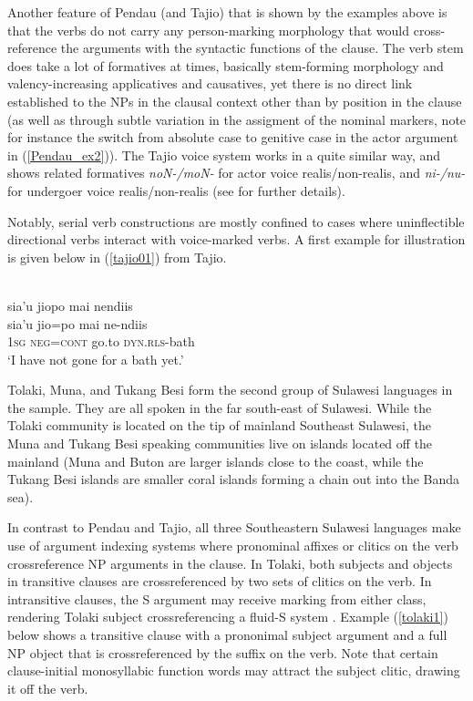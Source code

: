 Another feature of Pendau (and Tajio) that is shown by the examples above is that the verbs do not carry any person-marking morphology that would cross-reference the arguments with the syntactic functions of the clause. The verb stem does take a lot of formatives at times, basically stem-forming morphology and valency-increasing applicatives and causatives, yet there is no direct link established to the NPs in the clausal context other than by position in the clause (as well as through subtle variation in the assigment of the nominal markers, note for instance the switch from absolute case to genitive case in the actor argument in (\ref{Pendau_ex2})). The Tajio voice system works in a quite similar way, and shows related formatives \textit{noN-/moN-} for actor voice realis/non-realis, and \textit{ni-/nu-} for undergoer voice realis/non-realis (see \citealt{mayani2013grammar} for further details). 

Notably, serial verb constructions are mostly confined to cases where uninflectible directional verbs interact with voice-marked verbs. A first example for illustration is given below in (\ref{tajio01}) from Tajio.

\ea \label{tajio01}
\\
\glll sia’u jiopo mai nendiis \\
sia’u jio=po mai ne-ndiis \\
 \textsc{1}\textsc{sg} \textsc{neg}=\textsc{cont} go.to \textsc{dyn}.\textsc{rls}-bath\\
\glft ‘I have not gone for a bath yet.’\\ 
\z

Tolaki, Muna, and Tukang Besi form the second group of Sulawesi languages in the sample. They are all spoken in the far south-east of Sulawesi. While the Tolaki community is located on the tip of mainland Southeast Sulawesi, the Muna and Tukang Besi speaking communities live on islands located off the mainland (Muna and Buton are larger islands close to the coast, while the Tukang Besi islands are smaller coral islands forming a chain out into the Banda sea). 

In contrast to Pendau and Tajio, all three Southeastern Sulawesi languages make use of argument indexing systems where pronominal affixes or clitics on the verb crossreference NP arguments in the clause. In Tolaki, both subjects and objects in transitive clauses are crossreferenced by two sets of clitics on the verb. In intransitive clauses, the S argument may receive marking from either class, rendering Tolaki subject crossreferencing a fluid-S system \citep[115]{mead2008verb}. Example (\ref{tolaki1}) below shows a transitive clause with a prononimal subject argument and a full NP object that is crossreferenced by the suffix on the verb. Note that certain clause-initial monosyllabic function words may attract the subject clitic, drawing it off the verb.


